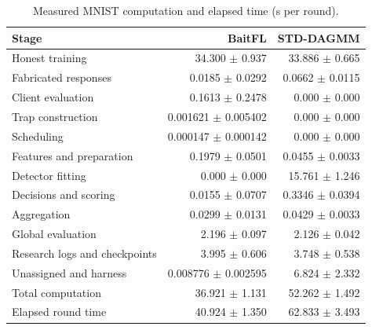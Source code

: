 \begin{table}[t]\centering\footnotesize\setlength{\tabcolsep}{8pt}
\caption{Measured MNIST computation and elapsed time (s per round).}\label{tab:std-segments-mnist}
\begin{tabular}{lrr}\toprule Stage & BaitFL & STD-DAGMM \\ \midrule
Honest training & 34.300 $\pm$ 0.937 & 33.886 $\pm$ 0.665 \\
Fabricated responses & 0.0185 $\pm$ 0.0292 & 0.0662 $\pm$ 0.0115 \\
Client evaluation & 0.1613 $\pm$ 0.2478 & 0.000 $\pm$ 0.000 \\
Trap construction & 0.001621 $\pm$ 0.005402 & 0.000 $\pm$ 0.000 \\
Scheduling & 0.000147 $\pm$ 0.000142 & 0.000 $\pm$ 0.000 \\
Features and preparation & 0.1979 $\pm$ 0.0501 & 0.0455 $\pm$ 0.0033 \\
Detector fitting & 0.000 $\pm$ 0.000 & 15.761 $\pm$ 1.246 \\
Decisions and scoring & 0.0155 $\pm$ 0.0707 & 0.3346 $\pm$ 0.0394 \\
Aggregation & 0.0299 $\pm$ 0.0131 & 0.0429 $\pm$ 0.0033 \\
Global evaluation & 2.196 $\pm$ 0.097 & 2.126 $\pm$ 0.042 \\
\midrule
Research logs and checkpoints & 3.995 $\pm$ 0.606 & 3.748 $\pm$ 0.538 \\
Unassigned and harness & 0.008776 $\pm$ 0.002595 & 6.824 $\pm$ 2.332 \\
\midrule
Total computation & 36.921 $\pm$ 1.131 & 52.262 $\pm$ 1.492 \\
Elapsed round time & 40.924 $\pm$ 1.350 & 62.833 $\pm$ 3.493 \\
\bottomrule\end{tabular}\end{table}
